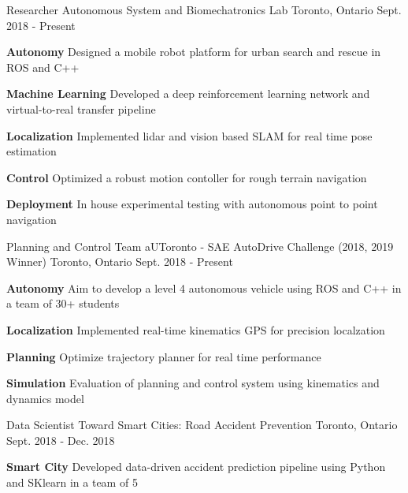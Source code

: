\begin{cventries}
	\cventry
	{Researcher}
	{Autonomous System and Biomechatronics Lab}
	{Toronto, Ontario}
	{Sept. 2018 - Present}
	{
		\begin{cvitems}
			\item {
				\textbf{Autonomy} Designed a mobile robot platform for urban search and rescue in ROS and C++
			}
			\item {
				\textbf{Machine Learning} Developed a deep reinforcement learning network and virtual-to-real transfer pipeline
			}
			\item {
				\textbf{Localization} Implemented lidar and vision based SLAM for real time pose estimation
			}
			\item {
				\textbf{Control} Optimized a robust motion contoller for rough terrain navigation
			}
			\item {
				\textbf{Deployment} In house experimental testing with autonomous point to point navigation
			}
		\end{cvitems}
	}
	\cventry
	{Planning and Control Team}
	{aUToronto - SAE AutoDrive Challenge (2018, 2019 Winner)}
	{Toronto, Ontario}
	{Sept. 2018 - Present}
	{
		\begin{cvitems}
			\item {\textbf{Autonomy} Aim to develop a level 4 autonomous vehicle using ROS and C++ in a team of 30+ students}
			\item {\textbf{Localization} Implemented real-time kinematics GPS for precision localzation
			}
			\item {\textbf{Planning} Optimize trajectory planner for real time performance		
			}
			\item {\textbf{Simulation} Evaluation of planning and control system using kinematics and dynamics model
			}
		\end{cvitems}
	}	
	\cventry
	{Data Scientist}
	{Toward Smart Cities: Road Accident Prevention}
	{Toronto, Ontario}
	{Sept. 2018 - Dec. 2018}
	{
		\begin{cvitems}
			\item {\textbf{Smart City} Developed data-driven accident prediction pipeline using Python and SKlearn in a team of 5}

\end{cvitems}}
\end{cventries}
